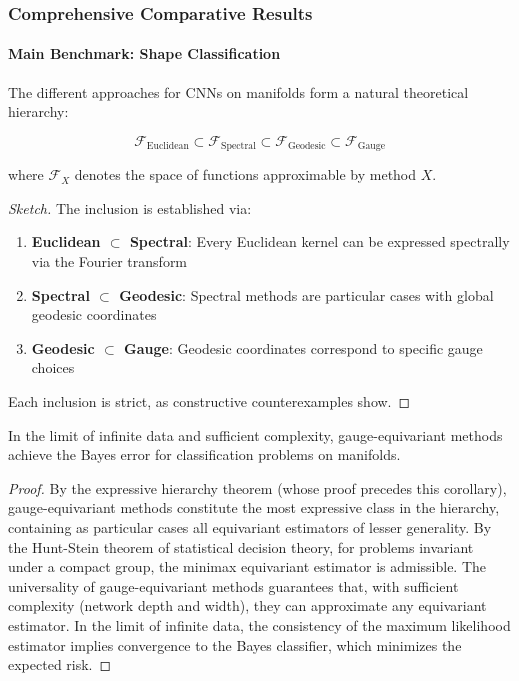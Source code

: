 \subsubsection{Comprehensive Comparative Results}\label{subsubsec:resultados_comparativos}

\paragraph{Main Benchmark: Shape Classification}

\begin{theorem}
The different approaches for CNNs on manifolds form a natural theoretical hierarchy:

\begin{equation}
\mathcal{F}_{\text{Euclidean}} \subset \mathcal{F}_{\text{Spectral}} \subset \mathcal{F}_{\text{Geodesic}} \subset \mathcal{F}_{\text{Gauge}}
\end{equation}

where $\mathcal{F}_X$ denotes the space of functions approximable by method $X$.
\end{theorem}

\begin{proof}[Sketch]
The inclusion is established via:
\begin{enumerate}
    \item \textbf{Euclidean $\subset$ Spectral}: Every Euclidean kernel can be expressed spectrally via the Fourier transform
    \item \textbf{Spectral $\subset$ Geodesic}: Spectral methods are particular cases with global geodesic coordinates
    \item \textbf{Geodesic $\subset$ Gauge}: Geodesic coordinates correspond to specific gauge choices
\end{enumerate}
Each inclusion is strict, as constructive counterexamples show.
\end{proof}

\begin{corollary}
In the limit of infinite data and sufficient complexity, gauge-equivariant methods achieve the Bayes error for classification problems on manifolds.
\end{corollary}

\begin{proof}
By the expressive hierarchy theorem (whose proof precedes this corollary), gauge-equivariant methods constitute the most expressive class in the hierarchy, containing as particular cases all equivariant estimators of lesser generality. By the Hunt-Stein theorem of statistical decision theory, for problems invariant under a compact group, the minimax equivariant estimator is admissible. The universality of gauge-equivariant methods guarantees that, with sufficient complexity (network depth and width), they can approximate any equivariant estimator. In the limit of infinite data, the consistency of the maximum likelihood estimator implies convergence to the Bayes classifier, which minimizes the expected risk.
\end{proof}

